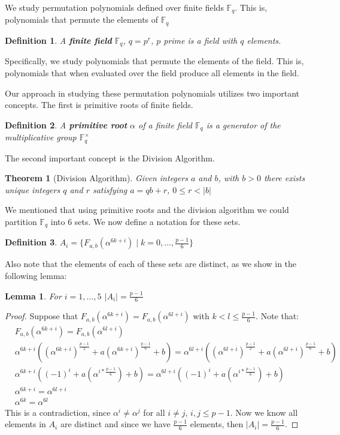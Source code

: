 \documentclass[12pt]{article}
\newtheorem{definition}{Definition}
\newtheorem{lemma}{Lemma}
\newtheorem{theorem}{Theorem}
\begin{document}
We study permutation polynomials defined over finite fields $\mathbb{F}_{q}$. This is, polynomials that permute the elements of $\mathbb{F}_{q}$

\begin{definition}
	A \textbf{finite field} $\mathbb{F}_{q}$, $q=p^{r}$, $p$ prime is a field with $q$ elements.
\end{definition}

Specifically, we study polynomials that permute the elements of the field. This is, polynomials that when evaluated over the field produce all elements in the field.


Our approach in studying these permutation polynomials utilizes two important concepts. The first is primitive roots of finite fields.
\begin{definition}
	A \textbf{primitive root} $\alpha$ of a finite field $\mathbb{F}_{q}$ is a generator of the multiplicative group $\mathbb{F}_{q}^{\times}$
\end{definition}

The second important concept is the Division Algorithm.
\begin{theorem}[Division Algorithm]
	Given integers $a$ and $b$, with $b>0$ there exists unique integers $q$ and $r$ satisfying $a=qb+r$, $0 \leq r < |b|$
\end{theorem}

We mentioned that using primitive roots and the division algorithm we could partition $\mathbb{F}_{q}$ into $6$ sets. We now define a notation for these sets.

\begin{definition}
	$A_{i}=\lbrace F_{a,b}(\alpha^{6k+i}) \mid k=0,...,\frac{p-1}{6}\rbrace$
\end{definition}
Also note that the elements of each of these sets are distinct, as we show in the following lemma:
\pagebreak
\begin{lemma}
	For $i=1,...,5$ $\left\vert A_{i} \right\vert = \frac{p-1}{6}$
\end{lemma}

\begin{proof}
	Suppose that $F_{a,b}(\alpha^{6k+i})=F_{a,b}(\alpha^{6l+i})$ with $k<l\leq \frac{p-1}{6}$. Note that:
	\begin{align*}
	&F_{a,b}(\alpha^{6k+i})=F_{a,b}(\alpha^{6l+i}) \\
	&\alpha^{6k+i}((\alpha^{6k+i})^{\frac{p-1}{2}}+a(\alpha^{6k+i})^{\frac{p-1}{6}}+b) = \alpha^{6l+i}((\alpha^{6l+i})^{\frac{p-1}{2}}+a(\alpha^{6l+i})^{\frac{p-1}{6}}+b) \\
	&\alpha^{6k+i}((-1)^{i}+a(\alpha^{i*\frac{p-1}{6}})+b) = \alpha^{6l+i}((-1)^{i}+a(\alpha^{i*\frac{p-1}{6}})+b) \\
	&\alpha^{6k+i} = \alpha^{6l+i} \\
	&\alpha^{6k} = \alpha^{6l}
	\end{align*}
	This is a contradiction, since $\alpha^{i} \neq \alpha^{j}$ for all $i \neq j$, $i,j \leq p-1$. Now we know all elements in $A_{i}$ are distinct and since we have $\frac{p-1}{6}$ elements, then $\left\vert A_{i} \right\vert = \frac{p-1}{6}$.
\end{proof}
\end{document}
